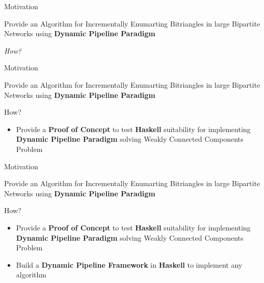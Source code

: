 \documentclass{beamer}
\begin{document}
  \begin{frame}[fragile]{Motivation}
    \begin{center}
      Provide an Algorithm for Incrementally Enumarting Bitriangles in large Bipartite Networks using \textbf{Dynamic Pipeline Paradigm}
    \end{center}    
    \vspace{0.5cm}
    \begin{center}
      \huge\emph{How?}
    \end{center}  
  \end{frame}

  \begin{frame}[fragile]{Motivation}
    \begin{center}
      Provide an Algorithm for Incrementally Enumarting Bitriangles in large Bipartite Networks using \textbf{Dynamic Pipeline Paradigm}
    \end{center}    
    \begin{block}{How?}
      \begin{itemize}
        \item Provide a \textbf{Proof of Concept} to test \textbf{Haskell} suitability for implementing  \textbf{Dynamic Pipeline Paradigm} solving Weakly Connected Components Problem
    \end{itemize}   
  \end{block} 
  \end{frame}

  \begin{frame}[fragile]{Motivation}
    \begin{center}
      Provide an Algorithm for Incrementally Enumarting Bitriangles in large Bipartite Networks using \textbf{Dynamic Pipeline Paradigm}
    \end{center}    
    \begin{block}{How?}
      \begin{itemize}
        \item {\color{light}Provide a \textbf{Proof of Concept} to test \textbf{Haskell} suitability for implementing  \textbf{Dynamic Pipeline Paradigm} solving Weakly Connected Components Problem}
        \item Build a \textbf{Dynamic Pipeline Framework} in \textbf{Haskell} to implement any algorithm 
    \end{itemize}   
  \end{block} 
  \end{frame}
\end{document}
